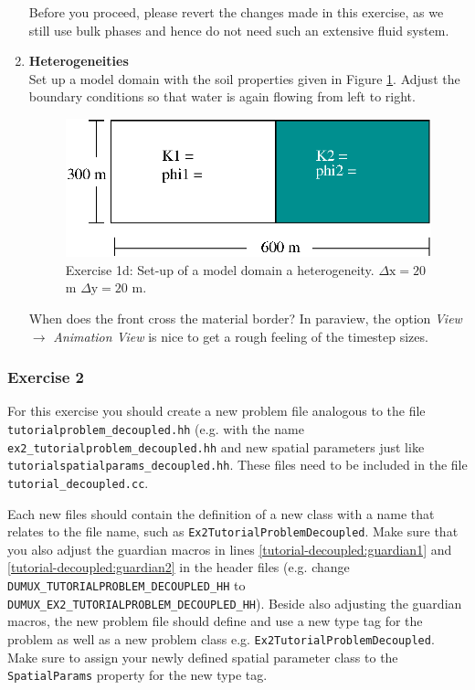 \begin{enumerate}
Before you proceed, please revert the changes made in this exercise,
as we still use bulk phases and hence do not need such an extensive
fluid system.
 
\item \textbf{Heterogeneities}  \\
  Set up a model domain with the soil properties given in Figure
  \ref{tutorial-deoucpled:exercise1_d}. Adjust the boundary conditions
  so that water is again flowing from left to right.
\begin{figure}[ht]
\centering
\includegraphics[width=0.5\linewidth,keepaspectratio]{EPS/exercise1_c.eps}
\caption{Exercise 1d: Set-up of a model domain a heterogeneity. $\Delta \text{x} = 20$ m $\Delta \text{y} = 20$ m.}\label{tutorial-deoucpled:exercise1_d}
\end{figure}
When does the front cross the material border? In paraview, the option \textit{View} $\rightarrow$ \textit{Animation View} is nice to get a rough feeling of the timestep sizes.
\end{enumerate}

\subsubsection{Exercise 2}
For this exercise you should create a new problem file analogous to
the file \texttt{tutorialproblem\_decoupled.hh} (e.g. with the name 
\texttt{ex2\_tutorialproblem\_decoupled.hh} and new spatial parameters 
just like \texttt{tutorialspatialparams\_decoupled.hh}. These files need to
be included in the file \texttt{tutorial\_decoupled.cc}. 

Each new files should contain the definition of a new class with a 
name that relates to the file name, such as \texttt{Ex2TutorialProblemDecoupled}. 
Make sure that you also adjust the guardian
macros in lines \ref{tutorial-decoupled:guardian1} and \ref{tutorial-decoupled:guardian2}
 in the header files (e.g. change \\
\texttt{DUMUX\_TUTORIALPROBLEM\_DECOUPLED\_HH} to
\texttt{DUMUX\_EX2\_TUTORIALPROBLEM\_DECOUPLED\_HH}).  Beside also adjusting the guardian macros, 
the new problem file should define and use a new type tag for the problem as well as a new problem class
e.g. \texttt{Ex2TutorialProblemDecoupled}. Make sure to assign your newly defined spatial 
parameter class to the \texttt{SpatialParams} property for the new 
type tag. 

